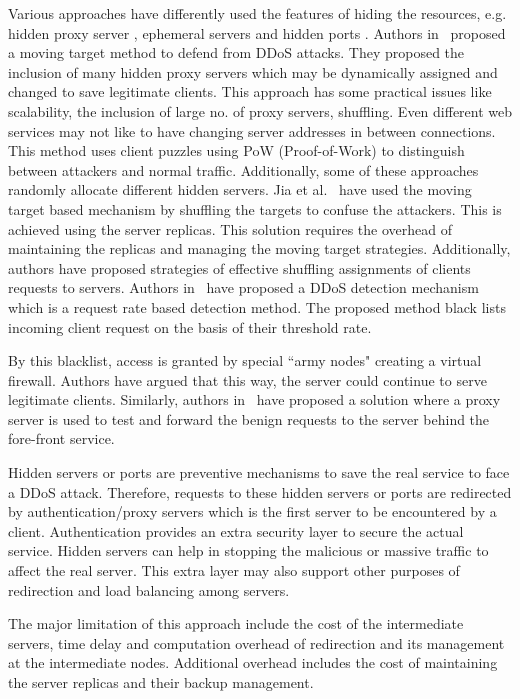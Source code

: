 \documentclass[final,5p,times,twocolumn]{elsarticle}
\begin{document}
Various approaches have differently used the features of hiding the resources, e.g. hidden proxy server \cite{moving}, ephemeral servers \cite{spow} and hidden ports \cite{edosarmor}. Authors in~\cite{moving} proposed a moving target method to defend from DDoS attacks. They proposed the inclusion of many hidden proxy servers which may be dynamically assigned and changed to save legitimate clients. This approach has some practical issues like scalability, the inclusion of large no. of proxy servers, shuffling. Even different web services may not like to have changing server addresses in between connections. This method uses client puzzles using PoW (Proof-of-Work) to distinguish between attackers and normal traffic. Additionally, some of these approaches randomly allocate different hidden servers. Jia et al.~\cite{jia2014catch} have used the moving target based mechanism by shuffling the targets to confuse the attackers. This is achieved using the server replicas. This solution requires the overhead of maintaining the replicas and managing the moving target strategies. Additionally, authors have proposed strategies of effective shuffling assignments of clients requests to servers. Authors in~\cite{army} have proposed a DDoS detection mechanism which is a request rate based detection method. The proposed method black lists incoming client request on the basis of their threshold rate. 

\noindent By this blacklist, access is granted by special ``army nodes" creating a virtual firewall. {Authors have argued that this way, the server could continue to serve legitimate clients. Similarly, authors in~\cite{nakao} have proposed a solution where a proxy server is used to test and forward the benign requests to the server behind the fore-front service. }

{Hidden servers or ports are preventive mechanisms to save the real service to face a DDoS attack. Therefore, requests to these hidden servers or ports are redirected by authentication/proxy servers which is the first server to be encountered by a client. Authentication provides an extra security layer to secure the actual service.  Hidden servers can help in stopping the malicious or massive traffic to affect the real server.  This extra layer may also support other purposes of redirection and load balancing among servers.}

{The major limitation of this approach include the cost of the intermediate servers, time delay and computation overhead of redirection and its management at the intermediate nodes. Additional overhead includes the cost of  maintaining the server replicas and their backup management. }
\end{document}
